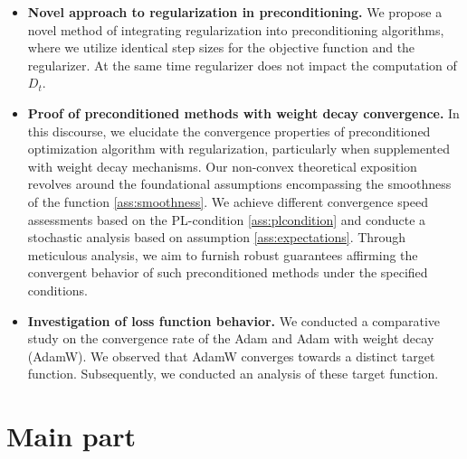 \documentclass[USenglish]{article}
\theoremstyle{dgthm}
\theoremstyle{dgdef}
\begin{document}
\begin{itemize}
    \item \textbf{Novel approach to regularization in preconditioning.} We propose a novel method of integrating regularization into preconditioning algorithms, where we utilize identical step sizes for the objective function and the regularizer. At the same time regularizer does not impact the computation of $D_t$.
    
    \item \textbf{Proof of preconditioned methods with weight decay convergence.}  In this discourse, we elucidate the convergence properties of preconditioned optimization algorithm with regularization, particularly when supplemented with weight decay mechanisms. Our non-convex theoretical exposition revolves around the foundational assumptions encompassing the smoothness of the function \eqref{ass:smoothness}. We achieve different convergence speed assessments based on the PL-condition \eqref{ass:plcondition} and conducte a stochastic analysis based on assumption \eqref{ass:expectations}. Through meticulous analysis, we aim to furnish robust guarantees affirming the convergent behavior of such preconditioned methods under the specified conditions.

    \item \textbf{Investigation of loss function behavior.} We conducted a comparative study on the convergence rate of the Adam and Adam with weight decay (AdamW). We observed that AdamW converges towards a distinct target function. Subsequently, we conducted an analysis of these target function.
    
\end{itemize}

\section{Main part}
\end{document}
